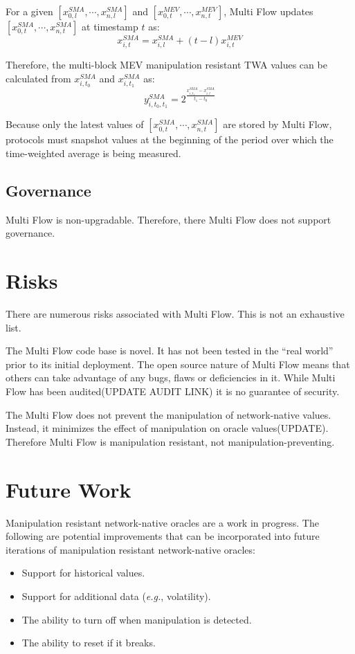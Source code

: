 \documentclass[tikz]{article}
\begin{document}
For a given $[x^{SMA}_{0,l}, \cdots, x^{SMA}_{n,l}]$ and $[x^{MEV}_{0,t}, \cdots, x^{MEV}_{n,t}]$, Multi Flow updates $[x^{SMA}_{0,t}, \cdots, x^{SMA}_{n,t}]$ at timestamp $t$ as:
$$
x^{SMA}_{i,t} = x^{SMA}_{i,l} + (t-l) x^{MEV}_{i,t}
$$

Therefore, the multi-block MEV manipulation resistant TWA values can be calculated from $x^{SMA}_{i,t_0}$ and $x^{SMA}_{i,t_1}$ as:
$$
y^{SMA}_{i,t_0,t_1} = 2^{\frac{x^{SMA}_{i,t_1} - x^{SMA}_{i,l}}{t_1-t_0}}
$$

Because only the latest values of $[x^{SMA}_{0,t}, \cdots, x^{SMA}_{n,t}]$ are stored by Multi Flow, protocols must snapshot values at the beginning of the period over which the time-weighted average is being measured.

\subsection{Governance}
Multi Flow is non-upgradable. Therefore, there Multi Flow does not support governance.

\section{Risks}
There are numerous risks associated with Multi Flow. This is not an exhaustive list.

The Multi Flow code base is novel. It has not been tested in the “real world” prior to its initial deployment. The open source nature of Multi Flow means that others can take advantage of any bugs, flaws or deficiencies in it. While Multi Flow has been audited(UPDATE AUDIT LINK) it is no guarantee of security. 

The Multi Flow does not prevent the manipulation of network-native values. Instead, it minimizes the effect of manipulation on oracle values(UPDATE). Therefore Multi Flow is manipulation resistant, not manipulation-preventing. 

\section{Future Work}
Manipulation resistant network-native oracles are a work in progress. The following are potential improvements that can be incorporated into future iterations of manipulation resistant network-native oracles:

\begin{itemize}
\item Support for historical values.
\item Support for additional data (\textit{e.g.}, volatility).
\item The ability to turn off when manipulation is detected.
\item The ability to reset if it breaks.
\end{itemize}
\end{document}
